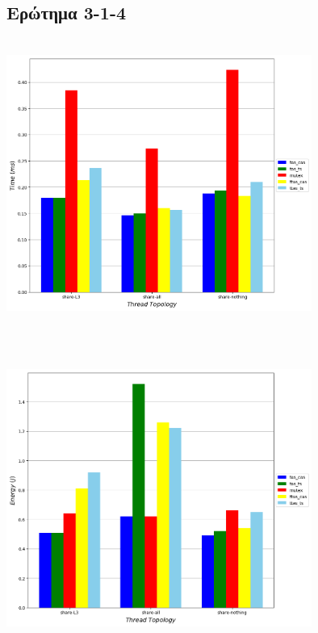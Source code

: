 \subsection{Ερώτημα 3-1-4}

\begin{minipage}{\textwidth}
   \begin{center}
      \\
      \vspace{3mm}
      \includegraphics[width=0.75\textwidth, frame]{./graphs/sniper/threads/topology-time-analysis.png}
      \vspace{6mm}
   \end{center}
\end{minipage}
\\
\begin{minipage}{\textwidth}
   \begin{center}
      \\
      \vspace{3mm}
      \includegraphics[width=0.75\textwidth, frame]{./graphs/sniper/threads/topology-energy-analysis.png}
      \vspace{6mm}
   \end{center}
\end{minipage}

